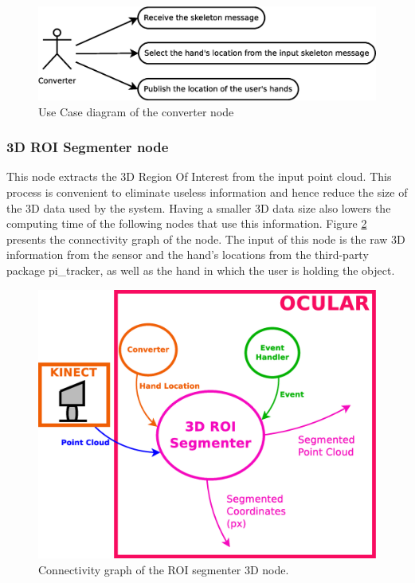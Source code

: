 	\begin{figure}[H]
		\centering
		\includegraphics[scale=0.4]{img/diagrams/uc_converter.eps}
		\caption[Use case diagram converter node]{Use Case diagram of the converter node}
		\label{uc_converter}
	\end{figure}
\vspace{0.5cm}


	
	\newpage

\subsubsection{3D ROI Segmenter node}
	\label{roi_segmenter_3d}

	This node extracts the 3D Region Of Interest from the input point cloud. 
	This process is convenient to eliminate useless information and hence reduce the size of the 3D data used by the system.  
	Having a smaller 3D data size also lowers the computing time of the following nodes that use this information. 
	Figure  \ref{node_roi3d} presents the connectivity graph of the node. 
	The input of this node is the raw 3D information from the sensor and the hand's locations from the third-party package pi\_tracker, as well as the hand in which the user is holding the object. 

	\vspace{0.5cm}
	\begin{figure}[H]
			\begin{center}
			\includegraphics[width=0.5\linewidth]{img/diagrams/node_roi3d.eps}
			\caption[ROI segmenter 3D node I/O]{Connectivity graph of the ROI segmenter 3D node.}		
			\label{node_roi3d}
			\end{center}
		\end{figure}


